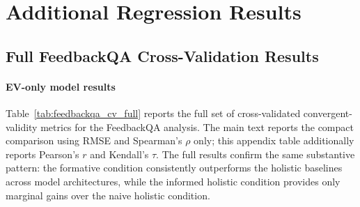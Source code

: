 \newpage

\section{Additional Regression Results}\label{app:additional_regression_results}


\subsection{Full FeedbackQA Cross-Validation Results}
\label{app:feedbackqa_full_cv}

\paragraph{EV-only model results}

Table~\ref{tab:feedbackqa_cv_full} reports the full set of cross-validated convergent-validity metrics for the FeedbackQA analysis. The main text reports the compact comparison using RMSE and Spearman's $\rho$ only; this appendix table additionally reports Pearson's $r$ and Kendall's $\tau$. The full results confirm the same substantive pattern: the formative condition consistently outperforms the holistic baselines across model architectures, while the informed holistic condition provides only marginal gains over the naive holistic condition.

